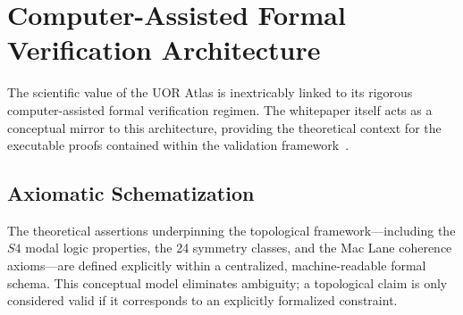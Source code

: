 \section{Computer-Assisted Formal Verification Architecture}

The scientific value of the UOR Atlas is inextricably linked to its rigorous computer-assisted formal verification regimen. The whitepaper itself acts as a conceptual mirror to this architecture, providing the theoretical context for the executable proofs contained within the validation framework~\cite{hales2008}.

\subsection{Axiomatic Schematization}
The theoretical assertions underpinning the topological framework---including the $S4$ modal logic properties, the 24 symmetry classes, and the Mac Lane coherence axioms---are defined explicitly within a centralized, machine-readable formal schema. This conceptual model eliminates ambiguity; a topological claim is only considered valid if it corresponds to an explicitly formalized constraint.

